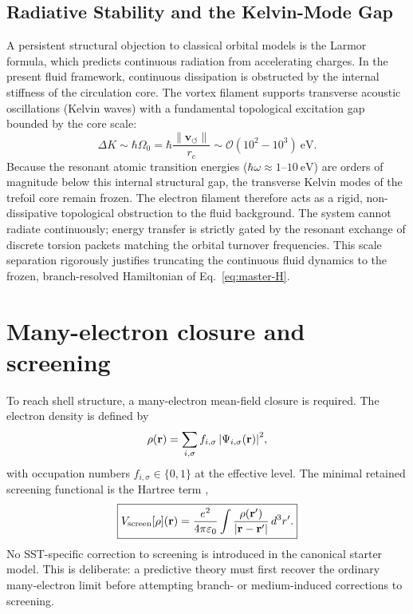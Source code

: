 \documentclass[11pt,a4paper]{article}
\newcommand{\rc}{r_c}
\begin{document}
\subsection{Radiative Stability and the Kelvin-Mode Gap}
A persistent structural objection to classical orbital models is the Larmor formula, which predicts continuous radiation from accelerating charges. In the present fluid framework, continuous dissipation is obstructed by the internal stiffness of the circulation core. The vortex filament supports transverse acoustic oscillations (Kelvin waves) with a fundamental topological excitation gap bounded by the core scale:
\begin{equation}
\label{eq:KelvinGap}
\Delta K \sim \hbar \Omega_0 = \hbar \frac{\lVert \mathbf{v}_{\!\boldsymbol{\circlearrowleft}}\rVert}{\rc} \sim \mathcal{O}(10^2 - 10^3)\ \mathrm{eV}.
\end{equation}
Because the resonant atomic transition energies ($\hbar\omega \approx 1\text{--}10\ \mathrm{eV}$) are orders of magnitude below this internal structural gap, the transverse Kelvin modes of the trefoil core remain frozen. The electron filament therefore acts as a rigid, non-dissipative topological obstruction to the fluid background. The system cannot radiate continuously; energy transfer is strictly gated by the resonant exchange of discrete torsion packets matching the orbital turnover frequencies. This scale separation rigorously justifies truncating the continuous fluid dynamics to the frozen, branch-resolved Hamiltonian of Eq.~\eqref{eq:master-H}.

\section{Many-electron closure and screening}
To reach shell structure, a many-electron mean-field closure is required. The electron density is defined by
\begin{equation}
\label{eq:rho-def}
\rho(\mathbf r)=\sum_{i,\sigma} f_{i,\sigma}\,\abs{\Psi_{i,\sigma}(\mathbf r)}^2,
\end{equation}
with occupation numbers $f_{i,\sigma}\in\{0,1\}$ at the effective level. The minimal retained screening functional is the Hartree term \cite{Hartree1928},
\begin{equation}
\label{eq:Vscreen}
\boxed{
V_{\rm screen}[\rho](\mathbf r)
=
\frac{e^2}{4\pi\varepsilon_0}
\int \frac{\rho(\mathbf r')}{\abs{\mathbf r-\mathbf r'}}\,d^3r'.
}
\end{equation}
No SST-specific correction to screening is introduced in the canonical starter model. This is deliberate: a predictive theory must first recover the ordinary many-electron limit before attempting branch- or medium-induced corrections to screening.
\end{document}
